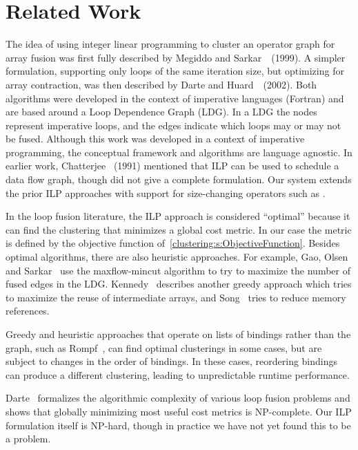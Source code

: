 \section{Related Work}
The idea of using integer linear programming to cluster an operator graph for array fusion was first fully described by Megiddo and Sarkar~\cite{megiddo1998optimal}~(1999).  A simpler formulation, supporting only loops of the same iteration size, but optimizing for array contraction, was then described by Darte and Huard~\cite{darte2002contraction}~(2002).  Both algorithms were developed in the context of imperative languages (Fortran) and are based around a Loop Dependence Graph (LDG).  In a LDG the nodes represent imperative loops, and the edges indicate which loops may or may not be fused.  Although this work was developed in a context of imperative programming, the conceptual framework and algorithms are language agnostic. In earlier work, Chatterjee~\cite{chatterjee1993nested} (1991) mentioned that ILP can be used to schedule a data flow graph, though did not give a complete formulation. Our system extends the prior ILP approaches with support for size-changing operators such as \Hs@filter@.

In the loop fusion literature, the ILP approach is considered ``optimal'' because it can find the clustering that minimizes a global cost metric. In our case the metric is defined by the objective function of~\cref{clustering:s:ObjectiveFunction}. Besides optimal algorithms, there are also heuristic approaches. For example, Gao, Olsen and Sarkar~\cite{gao1993collective} use the maxflow-mincut algorithm to try to maximize the number of fused edges in the LDG.  Kennedy~\cite{kennedy2001fastgreedy} describes another greedy approach which tries to maximize the reuse of intermediate arrays, and Song~\cite{song2004improving} tries to reduce memory references.

Greedy and heuristic approaches that operate on lists of bindings rather than the graph, such as Rompf~\cite{rompf2013optimizing}, can find optimal clusterings in some cases, but are subject to changes in the order of bindings. In these cases, reordering bindings can produce a different clustering, leading to unpredictable runtime performance.

Darte~\cite{darte1999complexity} formalizes the algorithmic complexity of various loop fusion problems and shows that globally minimizing most useful cost metrics is NP-complete. Our ILP formulation itself is NP-hard, though in practice we have not yet found this to be a problem.


